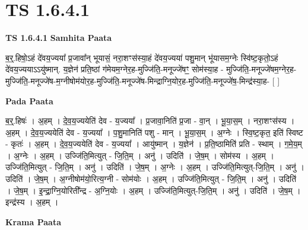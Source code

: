 \documentclass[17pt]{extarticle}
\begin{document}
\section{ TS 1.6.4.1 }

\textbf{TS 1.6.4.1 } \newline
\textbf{Samhita Paata} \newline

ब॒र्॒.हिषो॒ऽहं दे॑वय॒ज्यया᳚ प्र॒जावा᳚न् भूयासं॒ नरा॒शꣳस॑स्या॒हं दे॑वय॒ज्यया॑ पशु॒मान् भू॑यासम॒ग्नेः स्वि॑ष्ट॒कृतो॒ऽहं दे॑वय॒ज्ययाऽऽयु॑ष्मान्. य॒ज्ञेन॑ प्रति॒ष्ठां ग॑मेयम॒ग्नेर॒ह-मुज्जि॑ति॒-मनूज्जे॑षꣳ॒॒ सोम॑स्या॒ह - मुज्जि॑ति॒-मनूज्जे॑षम॒ग्नेर॒ह-मुज्जि॑ति॒-मनूज्जे॑ष-म॒ग्नीषोम॑योर॒ह-मुज्जि॑ति॒-मनूज्जे॑ष-मिन्द्राग्नि॒योर॒ह-मुज्जि॑ति॒-मनूज्जे॑ष॒-मिन्द्र॑स्या॒ह- [ ] \newline

\textbf{Pada Paata} \newline

ब॒र्॒.हिषः॑ । अ॒हम् । दे॒व॒य॒ज्ययेति॑ देव - य॒ज्यया᳚ । प्र॒जावा॒निति॑ प्र॒जा - वा॒न् । भू॒या॒स॒म् । नरा॒शꣳस॑स्य । अ॒हम् । दे॒व॒य॒ज्ययेति॑ देव - य॒ज्यया᳚ । प॒शु॒मानिति॑ पशु - मान् । भू॒या॒स॒म् । अ॒ग्नेः । स्वि॒ष्ट॒कृत॒ इति॑ स्विष्ट - कृतः॑ । अ॒हम् । दे॒व॒य॒ज्ययेति॑ देव - य॒ज्यया᳚ । आयु॑ष्मान् । य॒ज्ञेन॑ । प्र॒ति॒ष्ठामिति॑ प्रति - स्थाम् । ग॒मे॒य॒म् । अ॒ग्नेः । अ॒हम् । उज्जि॑ति॒मित्युत् - जि॒ति॒म् । अनु॑ । उदिति॑ । जे॒ष॒म् । सोम॑स्य । अ॒हम् । उज्जि॑ति॒मित्युत् - जि॒ति॒म् । अनु॑ । उदिति॑ । जे॒ष॒म् । अ॒ग्नेः । अ॒हम् । उज्जि॑ति॒मित्युत्-जि॒ति॒म् । अनु॑ । उदिति॑ । जे॒ष॒म् । अ॒ग्नीषोम॑यो॒रित्य॒ग्नी - सोम॑योः । अ॒हम् । उज्जि॑ति॒मित्युत् - जि॒ति॒म् । अनु॑ । उदिति॑ । जे॒ष॒म् । इ॒न्द्रा॒ग्नि॒योरिती᳚न्द्र - अ॒ग्नि॒योः । अ॒हम् । उज्जि॑ति॒मित्युत्-जि॒ति॒म् । अनु॑ । उदिति॑ । जे॒ष॒म् । इन्द्र॑स्य । अ॒हम् ।  \newline


\textbf{Krama Paata} \newline
\end{document}
